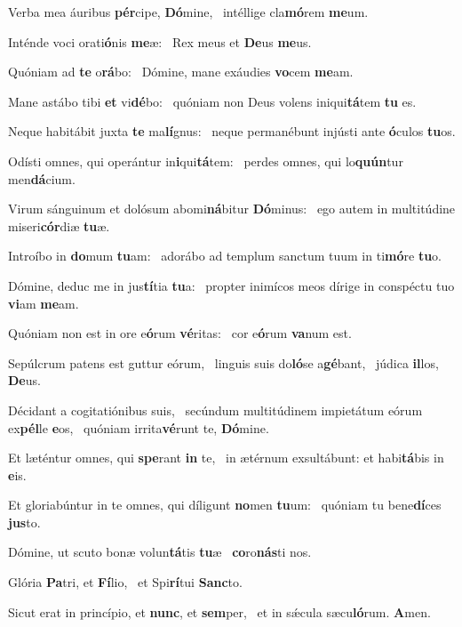 \item Verba mea áuribus \textbf{pér}cipe, \textbf{Dó}mine,~\psstar{} intéllige cla\textbf{mó}rem \textbf{me}um.
\item Inténde voci orati\textbf{ó}nis \textbf{me}æ:~\psstar{} Rex meus et \textbf{De}us \textbf{me}us.
\item Quóniam ad \textbf{te} o\textbf{rá}bo:~\psstar{} Dómine, mane exáudies \textbf{vo}cem \textbf{me}am.
\item Mane astábo tibi \textbf{et} vi\textbf{dé}bo:~\psstar{} quóniam non Deus volens iniqui\textbf{tá}tem \textbf{tu} es.
\item Neque habitábit juxta \textbf{te} ma\textbf{lí}gnus:~\psstar{} neque permanébunt injústi ante \textbf{ó}culos \textbf{tu}os.
\item Odísti omnes, qui operántur in\textbf{i}qui\textbf{tá}tem:~\psstar{} perdes omnes, qui lo\textbf{quún}tur men\textbf{dá}cium.
\item Virum sánguinum et dolósum abomi\textbf{ná}bitur \textbf{Dó}minus:~\psstar{} ego autem in multitúdine miseri\textbf{cór}diæ \textbf{tu}æ.
\item Introíbo in \textbf{do}mum \textbf{tu}am:~\psstar{} adorábo ad templum sanctum tuum in ti\textbf{mó}re \textbf{tu}o.
\item Dómine, deduc me in jus\textbf{tí}tia \textbf{tu}a:~\psstar{} propter inimícos meos dírige in conspéctu tuo \textbf{vi}am \textbf{me}am.
\item Quóniam non est in ore e\textbf{ó}rum \textbf{vé}ritas:~\psstar{} cor e\textbf{ó}rum \textbf{va}num est.
\item Sepúlcrum patens est guttur eórum,~\pscross{} linguis suis do\textbf{ló}se a\textbf{gé}bant,~\psstar{} júdica \textbf{il}los, \textbf{De}us.
\item Décidant a cogitatiónibus suis,~\pscross{} secúndum multitúdinem impietátum eórum ex\textbf{pél}le \textbf{e}os,~\psstar{} quóniam irrita\textbf{vé}runt te, \textbf{Dó}mine.
\item Et læténtur omnes, qui \textbf{spe}rant \textbf{in} te,~\psstar{} in ætérnum exsultábunt: et habi\textbf{tá}bis in \textbf{e}is.
\item Et gloriabúntur in te omnes, qui díligunt \textbf{no}men \textbf{tu}um:~\psstar{} quóniam tu bene\textbf{dí}ces \textbf{jus}to.
\item Dómine, ut scuto bonæ volun\textbf{tá}tis \textbf{tu}æ~\psstar{} \textbf{co}ro\textbf{nás}ti nos.
\item Glória \textbf{Pa}tri, et \textbf{Fí}lio,~\psstar{} et Spi\textbf{rí}tui \textbf{Sanc}to.
\item Sicut erat in princípio, et \textbf{nunc}, et \textbf{sem}per,~\psstar{} et in sǽcula sæcu\textbf{ló}rum. \textbf{A}men.
